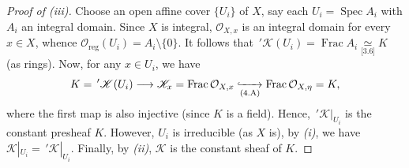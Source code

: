 \documentclass[11pt,a4paper,footinclude=true,headinclude=true]{scrbook} %
\DeclareMathOperator{\Spec}{Spec}
\DeclareMathOperator{\Frac}{Frac}
\newcommand{\KK}{\mathscr{K}}
\newcommand{\OO}{\mathcal{O}}
\newcommand{\reg}{\mathrm{reg}}
\newcommand{\<}{\langle}
\newcommand{\>}{\rangle}
\begin{document}
\begin{proof}[Proof of (iii)]
    Choose an open affine cover $\{U_i\}$ of $X$, say each $U_i=\Spec A_i$ with $A_i$ an integral domain. Since $X$ is integral, $\OO_{X,x}$ is an integral domain for every $x\in X$, whence $\OO_\reg(U_i)=A_i\setminus\{0\}$. It follows that $\,'\KK(U_i)=\Frac A_i\underset{\text{[3.6]}}{\simeq}K$ (as rings). Now, for any $x\in U_i$, we have
    \begin{align*}
        K=\,'\KK(U_i)\longrightarrow\KK_x=\Frac\OO_{X,x}\underset{\text{(4.A)}}{\xhookrightarrow{~~~~~}}\Frac\OO_{X,\eta}=K,
    \end{align*}
    where the first map is also injective (since $K$ is a field). Hence, $\,'\KK|_{U_i}$ is the constant presheaf $K$. However, $U_i$ is irreducible (as $X$ is), by \textit{(i)}, we have $\KK|_{U_i}=\,'\KK|_{U_i}$. Finally, by \textit{(ii)}, $\KK$ is the constant sheaf of $K$.
\end{proof}
\end{document}
